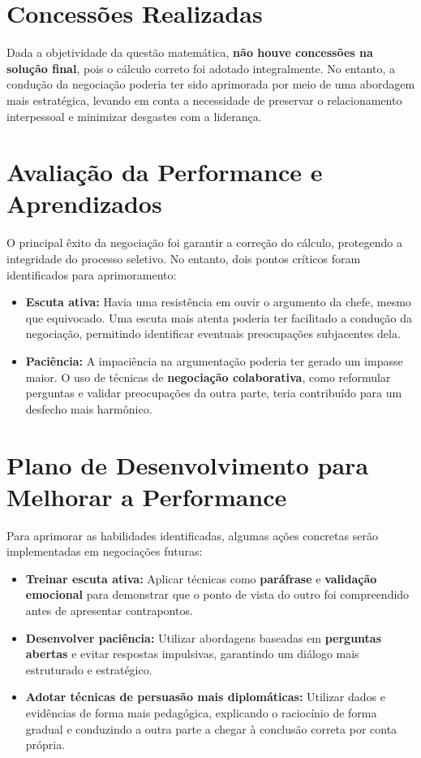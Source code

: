 \documentclass[11pt]{article}
\begin{document}
\section*{Concessões Realizadas}
\label{sec:org7e2b876}
Dada a objetividade da questão matemática, \textbf{não houve concessões na solução final}, pois o cálculo correto foi adotado integralmente. No entanto, a condução da negociação poderia ter sido aprimorada por meio de uma abordagem mais estratégica, levando em conta a necessidade de preservar o relacionamento interpessoal e minimizar desgastes com a liderança.
\section*{Avaliação da Performance e Aprendizados}
\label{sec:org4ff9735}
O principal êxito da negociação foi garantir a correção do cálculo, protegendo a integridade do processo seletivo. No entanto, dois pontos críticos foram identificados para aprimoramento:

\begin{itemize}
\item \textbf{Escuta ativa:} Havia uma resistência em ouvir o argumento da chefe, mesmo que equivocado. Uma escuta mais atenta poderia ter facilitado a condução da negociação, permitindo identificar eventuais preocupações subjacentes dela.
\item \textbf{Paciência:} A impaciência na argumentação poderia ter gerado um impasse maior. O uso de técnicas de \textbf{negociação colaborativa}, como reformular perguntas e validar preocupações da outra parte, teria contribuído para um desfecho mais harmônico.
\end{itemize}
\section*{Plano de Desenvolvimento para Melhorar a Performance}
\label{sec:orgcad2ab7}
Para aprimorar as habilidades identificadas, algumas ações concretas serão implementadas em negociações futuras:

\begin{itemize}
\item \textbf{Treinar escuta ativa:} Aplicar técnicas como \textbf{paráfrase} e \textbf{validação emocional} para demonstrar que o ponto de vista do outro foi compreendido antes de apresentar contrapontos.
\item \textbf{Desenvolver paciência:} Utilizar abordagens baseadas em \textbf{perguntas abertas} e evitar respostas impulsivas, garantindo um diálogo mais estruturado e estratégico.
\item \textbf{Adotar técnicas de persuasão mais diplomáticas:} Utilizar dados e evidências de forma mais pedagógica, explicando o raciocínio de forma gradual e conduzindo a outra parte a chegar à conclusão correta por conta própria.
\end{itemize}
\end{document}
